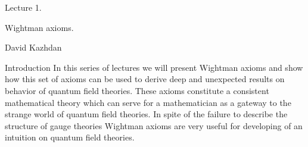\def\grA{{\gr A}}	\def\gra{{\gr a}}
\def\grB{{\gr B}}	\def\grb{{\gr b}}
\def\grC{{\gr C}}	\def\grc{{\gr c}}
\def\grD{{\gr D}}	\def\grd{{\gr d}}
\def\grE{{\gr E}}	\def\gre{{\gr e}}
\def\grF{{\gr F}}	\def\grf{{\gr f}}
\def\grG{{\gr G}}	\def\grg{{\gr g}}
\def\grH{{\gr H}}	\def\grh{{\gr h}}
\def\grI{{\gr I}}	\def\gri{{\gr i}}
\def\grJ{{\gr J}}	\def\grj{{\gr j}}
\def\grK{{\gr K}}	\def\grk{{\gr k}}
\def\grL{{\gr L}}	\def\grl{{\gr l}}
\def\grM{{\gr M}}	\def\grm{{\gr m}}
\def\grN{{\gr N}}	\def\grn{{\gr n}}
\def\grO{{\gr O}}	\def\gro{{\gr o}}
\def\grP{{\gr P}}	\def\grp{{\gr p}}
\def\grQ{{\gr Q}}	\def\grq{{\gr q}}
\def\grR{{\gr R}}	\def\grr{{\gr r}}
\def\grS{{\gr S}}	\def\grs{{\gr s}}
\def\grT{{\gr T}}	\def\grt{{\gr t}}
\def\grU{{\gr U}}	\def\gru{{\gr u}}
\def\grV{{\gr V}}	\def\grv{{\gr v}}
\def\grW{{\gr W}}	\def\grw{{\gr w}}
\def\grX{{\gr X}}	\def\grx{{\gr x}}
\def\grY{{\gr Y}}	\def\gry{{\gr y}}
\def\grZ{{\gr Z}}	\def\grz{{\gr z}}


\def\scr#1{{\fam\eusmfam\relax#1}}

\def\scrA{{\scr A}}   \def\scrB{{\scr B}}
\def\scrC{{\scr C}}   \def\scrD{{\scr D}}
\def\scrE{{\scr E}}   \def\scrF{{\scr F}}
\def\scrG{{\scr G}}   \def\scrH{{\scr H}}
\def\scrI{{\scr I}}   \def\scrJ{{\scr J}}
\def\scrK{{\scr K}}   \def\scrL{{\scr L}}
\def\scrM{{\scr M}}   \def\scrN{{\scr N}}
\def\scrO{{\scr O}}   \def\scrP{{\scr P}}
\def\scrQ{{\scr Q}}   \def\scrR{{\scr R}}
\def\scrS{{\scr S}}   \def\scrT{{\scr T}}
\def\scrU{{\scr U}}   \def\scrV{{\scr V}}
\def\scrW{{\scr W}}   \def\scrX{{\scr X}}
\def\scrY{{\scr Y}}   \def\scrZ{{\scr Z}}

\def\gr#1{{\fam\eufmfam\relax#1}}


\def\grg{{\frak g}}
\def\grp{{\frak p}}


\document

\centerline{\bigboldtitlefont Lecture 1.}

\centerline{\boldtitlefont Wightman axioms.}

\bigskip
\centerline{David Kazhdan}

\subhead Introduction\endsubhead
In this series of lectures we will present  Wightman axioms and show how 
this set of axioms can be used to derive deep and unexpected results on  
behavior of  quantum field theories. These axioms constitute a consistent 
mathematical theory which can serve for a mathematician as a gateway to the 
strange world of quantum field theories. In spite of the failure to 
describe the structure of gauge theories    Wightman axioms are very useful 
for developing of an intuition on quantum field theories.  


